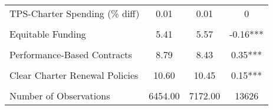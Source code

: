 \begin{table}[!h]
\begin{tabular}[t]{lccc}
TPS-Charter Spending (\% diff) & 0.01 & 0.01 & 0\\
\cellcolor{gray!10}{Total Spending (per-pupil)} & \cellcolor{gray!10}{13194.43} & \cellcolor{gray!10}{15038.02} & \cellcolor{gray!10}{-1843.59***}\\
Equitable Funding & 5.41 & 5.57 & -0.16***\\
\cellcolor{gray!10}{No Caps on CS Growth} & \cellcolor{gray!10}{8.55} & \cellcolor{gray!10}{8.54} & \cellcolor{gray!10}{0.02}\\
Performance-Based Contracts & 8.79 & 8.43 & 0.35***\\
\cellcolor{gray!10}{Transparent Charter Startup Policies} & \cellcolor{gray!10}{8.39} & \cellcolor{gray!10}{8.60} & \cellcolor{gray!10}{-0.21***}\\
Clear Charter Renewal Policies & 10.60 & 10.45 & 0.15***\\
\cellcolor{gray!10}{Exempt from State/District Regs} & \cellcolor{gray!10}{7.33} & \cellcolor{gray!10}{7.01} & \cellcolor{gray!10}{0.32***}\\
\midrule
Number of Observations & 6454.00 & 7172.00 & 13626\\
\bottomrule
\end{tabular}
\end{table}
